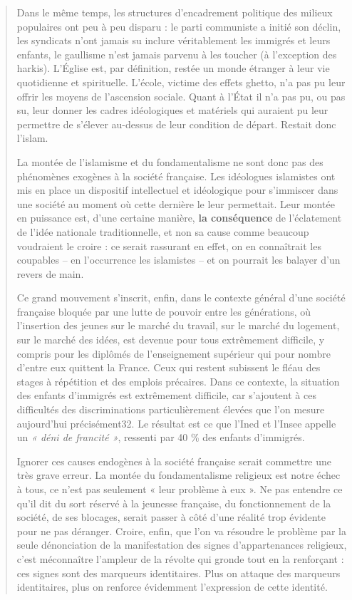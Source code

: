 \begin{quote}
Dans le même temps, les structures d'encadrement politique des milieux
populaires ont peu à peu disparu : le parti communiste a initié son
déclin, les syndicats n'ont jamais su inclure véritablement les immigrés
et leurs enfants, le gaullisme n'est jamais parvenu à les toucher (à
l'exception des harkis). L'Église est, par définition, restée un monde
étranger à leur vie quotidienne et spirituelle. L'école, victime des
effets ghetto, n'a pas pu leur offrir les moyens de l'ascension sociale.
Quant à l'État il n'a pas pu, ou pas su, leur donner les cadres
idéologiques et matériels qui auraient pu leur permettre de s'élever
au-dessus de leur condition de départ. Restait donc l'islam.



La montée de l'islamisme et du fondamentalisme ne sont donc pas des
phénomènes exogènes à la société française. Les idéologues islamistes
ont mis en place un dispositif intellectuel et idéologique pour
s'immiscer dans une société au moment où cette dernière le leur
permettait. Leur montée en puissance est, d'une certaine manière,
\textbf{la conséquence} de l'éclatement de l'idée nationale
traditionnelle, et non sa cause comme beaucoup voudraient le croire : ce
serait rassurant en effet, on en connaîtrait les coupables -- en
l'occurrence les islamistes -- et on pourrait les balayer d'un revers de
main.

Ce grand mouvement s'inscrit, enfin, dans le contexte général d'une
société française bloquée par une lutte de pouvoir entre les
générations, où l'insertion des jeunes sur le marché du travail, sur le
marché du logement, sur le marché des idées, est devenue pour tous
extrêmement difficile, y compris pour les diplômés de l'enseignement
supérieur qui pour nombre d'entre eux quittent la France. Ceux qui
restent subissent le fléau des stages à répétition et des emplois
précaires. Dans ce contexte, la situation des enfants d'immigrés est
extrêmement difficile, car s'ajoutent à ces difficultés des
discriminations particulièrement élevées que l'on mesure aujourd'hui
précisément32. Le résultat est ce que l'Ined et l'Insee appelle un
\emph{« déni de francité »}, ressenti par 40 \% des enfants d'immigrés.

Ignorer ces causes endogènes à la société française serait commettre une
très grave erreur. La montée du fondamentalisme religieux est notre
échec à tous, ce n'est pas seulement « leur problème à eux ». Ne pas
entendre ce qu'il dit du sort réservé à la jeunesse française, du
fonctionnement de la société, de ses blocages, serait passer à côté
d'une réalité trop évidente pour ne pas déranger. Croire, enfin, que
l'on va résoudre le problème par la seule dénonciation de la
manifestation des signes d'appartenances religieux, c'est méconnaître
l'ampleur de la révolte qui gronde tout en la renforçant : ces signes
sont des marqueurs identitaires. Plus on attaque des marqueurs
identitaires, plus on renforce évidemment l'expression de cette
identité.


\end{quote}
